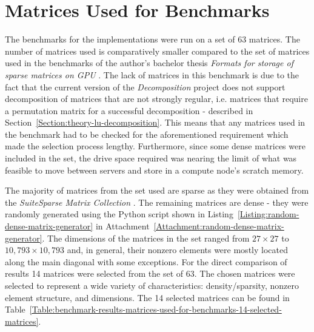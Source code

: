 \section{Matrices Used for Benchmarks \TO}
The benchmarks for the implementations were run on a set of 63 matrices. The number of matrices used is comparatively smaller compared to the set of matrices used in the benchmarks of the author's bachelor thesis \textit{Formats for storage of sparse matrices on GPU} \cite{Cejka2020}. The lack of matrices in this benchmark is due to the fact that the current version of the \textit{Decomposition} project does not support decomposition of matrices that are not strongly regular, i.e. matrices that require a permutation matrix for a successful decomposition - described in Section~\ref{Section:theory-lu-decomposition}. This means that any matrices used in the benchmark had to be checked for the aforementioned requirement which made the selection process lengthy. Furthermore, since some dense matrices were included in the set, the drive space required was nearing the limit of what was feasible to move between servers and store in a compute node's scratch memory.
\par The majority of matrices from the set used are sparse as they were obtained from the \emph{SuiteSparse Matrix Collection} \cite{Davis2011}. The remaining matrices are dense - they were randomly generated using the Python script shown in Listing~\ref{Listing:random-dense-matrix-generator} in Attachment~\ref{Attachment:random-dense-matrix-generator}. The dimensions of the matrices in the set ranged from $ 27 \times 27 $ to $ 10,793 \times 10,793 $ and, in general, their nonzero elements were mostly located along the main diagonal with some exceptions. For the direct comparison of results 14 matrices were selected from the set of 63. The chosen matrices were selected to represent a wide variety of characteristics: density/sparsity, nonzero element structure, and dimensions. The 14 selected matrices can be found in Table~\ref{Table:benchmark-results-matrices-used-for-benchmarks-14-selected-matrices}.

